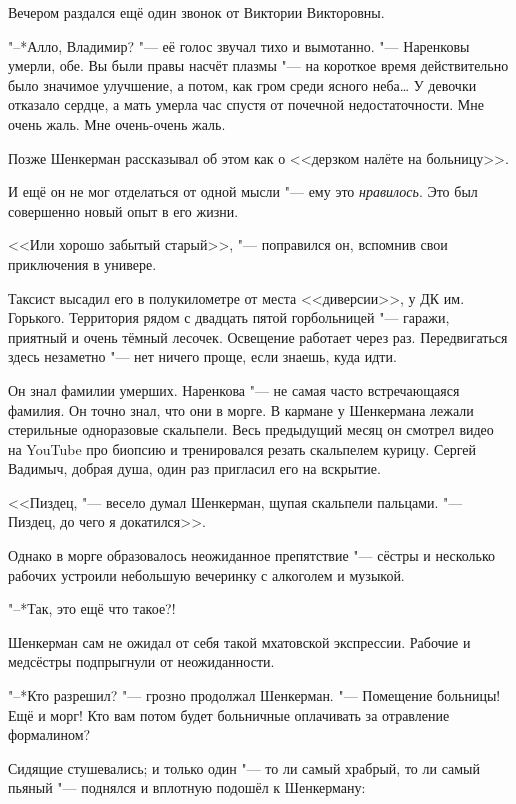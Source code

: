 Вечером раздался ещё один звонок от Виктории Викторовны.

"--*Алло, Владимир? "--- её голос звучал тихо и вымотанно.
"--- Наренковы умерли, обе.
Вы были правы насчёт плазмы "--- на короткое время действительно было значимое улучшение, а потом, как гром среди ясного неба\ldots{}
У девочки отказало сердце, а мать умерла час спустя от почечной недостаточности.
Мне очень жаль.
Мне очень-очень жаль.

\asterism

\textspace

Позже Шенкерман рассказывал об этом как о <<дерзком налёте на больницу>>.

\textspace

И ещё он не мог отделаться от одной мысли "--- ему это \emph{нравилось}.
Это был совершенно новый опыт в его жизни.

<<Или хорошо забытый старый>>, "--- поправился он, вспомнив свои приключения в универе.

Таксист высадил его в полукилометре от места <<диверсии>>, у ДК им. Горького.
Территория рядом с двадцать пятой горбольницей "--- гаражи, приятный и очень тёмный лесочек.
Освещение работает через раз.
Передвигаться здесь незаметно "--- нет ничего проще, если знаешь, куда идти.

Он знал фамилии умерших.
Наренкова "--- не самая часто встречающаяся фамилия.
Он точно знал, что они в морге.
В кармане у Шенкермана лежали стерильные одноразовые скальпели.
Весь предыдущий месяц он смотрел видео на YouTube про биопсию и тренировался резать скальпелем курицу.
Сергей Вадимыч, добрая душа, один раз пригласил его на вскрытие.

<<Пиздец, "--- весело думал Шенкерман, щупая скальпели пальцами.
"--- Пиздец, до чего я докатился>>.

\textspace

Однако в морге образовалось неожиданное препятствие "--- сёстры и несколько рабочих устроили небольшую вечеринку с алкоголем и музыкой.

"--*Так, это ещё что такое?!

Шенкерман сам не ожидал от себя такой мхатовской экспрессии.
Рабочие и медсёстры подпрыгнули от неожиданности.

"--*Кто разрешил? "--- грозно продолжал Шенкерман.
"--- Помещение больницы!
Ещё и морг!
Кто вам потом будет больничные оплачивать за отравление формалином?

Сидящие стушевались;
и только один "--- то ли самый храбрый, то ли самый пьяный "--- поднялся и вплотную подошёл к Шенкерману:

